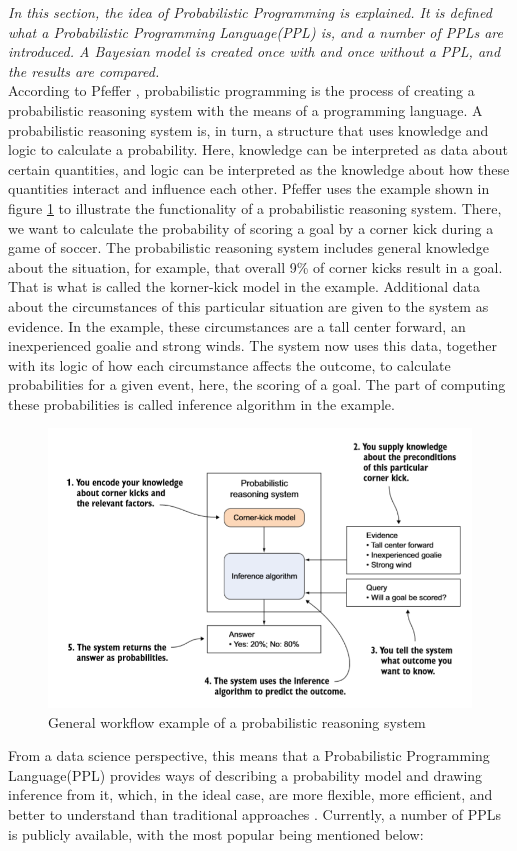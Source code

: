 \documentclass{article}
\begin{document}
\textit{In this section, the idea of Probabilistic Programming is explained. It is defined what a Probabilistic Programming Language(PPL) is, and a number of PPLs are introduced. A Bayesian model is created once with and once without a PPL, and the results are compared.}
\\
According to Pfeffer \cite{9781617292330}, probabilistic programming is the process of creating a probabilistic reasoning system with the means of a programming language. A probabilistic reasoning system is, in turn, a structure that uses knowledge and logic to calculate a probability. Here, knowledge can be interpreted as data about certain quantities, and logic can be interpreted as the knowledge about how these quantities interact and influence each other. Pfeffer \cite{9781617292330} uses the example shown in figure \ref{fig:example_prs} to illustrate the functionality of a probabilistic reasoning system. There, we want to calculate the probability of scoring a goal by a corner kick during a game of soccer. The probabilistic reasoning system includes general knowledge about the situation, for example, that overall 9\% of corner kicks result in a goal. That is what is called the korner-kick model in the example. Additional data about the circumstances of this particular situation are given to the system as evidence. In the example, these circumstances are a tall center forward, an inexperienced goalie and strong winds. The system now uses this data, together with its logic of how each circumstance affects the outcome, to calculate probabilities for a given event, here, the scoring of a goal. The part of computing these probabilities is called inference algorithm in the example.
\begin{figure}
	\includegraphics[width=\textwidth]{images/probabilistic_reasoning_system.PNG}
	\caption[General workflow example of a probabilistic reasoning system. Source: \cite{9781617292330}]{General workflow example of a probabilistic reasoning system}
	\label{fig:example_prs}
\end{figure}
From a data science perspective, this means that a Probabilistic Programming Language(PPL) provides ways of describing a probability model and drawing inference from it, which, in the ideal case, are more flexible, more efficient, and better to understand than traditional approaches \cite{Hardesty2015}. Currently, a number of PPLs is publicly available, with the most popular being mentioned below:
\end{document}
